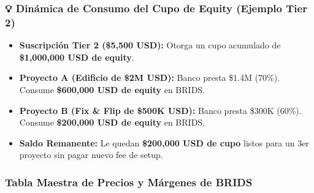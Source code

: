 \documentclass[
]{article}
\providecommand{\tightlist}{%
  \setlength{\itemsep}{0pt}\setlength{\parskip}{0pt}}
\renewenvironment{quote}{%
  \vspace{0.4em}
  \begin{tcolorbox}[
    colback=bridsLight,
    colframe=bridsBlue,
    arc=2mm,
    boxrule=1.2pt,
    left=10pt,
    right=10pt,
    top=8pt,
    bottom=8pt,
    before skip=6pt,
    after skip=8pt
  ]%
}{%
  \end{tcolorbox}%
}
\begin{document}
\begin{quote}
\mbox{}%
\subsubsection{💡 Dinámica de Consumo del Cupo de Equity (Ejemplo Tier
2)}\label{dinuxe1mica-de-consumo-del-cupo-de-equity-ejemplo-tier-2}

\begin{itemize}
\tightlist
\item
  \textbf{Suscripción Tier 2 (\$5,500 USD):} Otorga un cupo acumulado de
  \textbf{\$1,000,000 USD de equity}.
\item
  \textbf{Proyecto A (Edificio de \$2M USD):} Banco presta \$1.4M
  (70\%). Consume \textbf{\$600,000 USD de equity} en BRIDS.
\item
  \textbf{Proyecto B (Fix \& Flip de \$500K USD):} Banco presta \$300K
  (60\%). Consume \textbf{\$200,000 USD de equity} en BRIDS.
\item
  \textbf{Saldo Remanente:} Le quedan \textbf{\$200,000 USD de cupo}
  listos para un 3er proyecto sin pagar nuevo fee de setup.
\end{itemize}
\end{quote}

\subsubsection{Tabla Maestra de Precios y Márgenes de
BRIDS}\label{tabla-maestra-de-precios-y-muxe1rgenes-de-brids}
\end{document}
